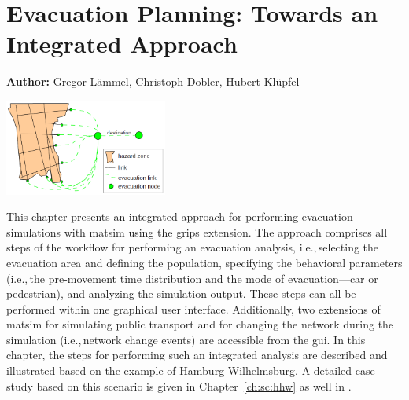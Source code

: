 \chapter{Evacuation Planning: Towards an Integrated Approach}
\label{ch:evacuation}

\hfill \textbf{Author:} Gregor Lämmel, Christoph Dobler, Hubert Klüpfel 

\begin{center} \includegraphics[width=0.4\textwidth, angle=0]{extending/figures/Evacuation/evacuation} \end{center}


This chapter presents an integrated approach for performing evacuation simulations with \gls{matsim} using the \gls{grips} extension. %
The approach comprises all steps of the workflow for performing an evacuation analysis, i.e.,\,selecting the evacuation area and defining the population, specifying the behavioral parameters (i.e.,\,the pre-movement time distribution and the mode of evacuation---car or pedestrian), and analyzing the simulation output. These steps can all be performed within one graphical user interface. Additionally, two extensions of \gls{matsim} for simulating public transport and for changing the network during the simulation (i.e.,\,network change events) are accessible from the \gls{gui}. In this chapter, the steps for performing such an integrated analysis are described and illustrated based on the example of Hamburg-Wilhelmsburg. A detailed case study based on this scenario is given in Chapter~\ref{ch:sc:hhw} as well in \citet{DurstAtAl2012PEDGRIPSAppl,Hugenbusch2012Bachelor}.

